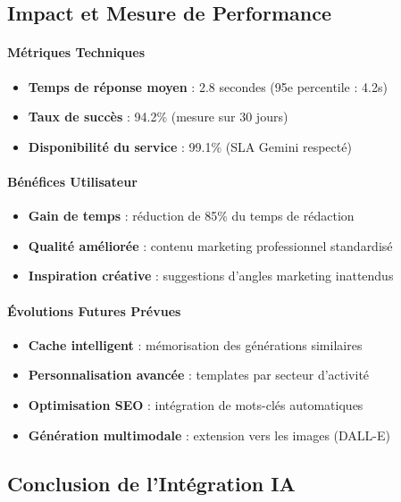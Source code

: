 \subsection{Impact et Mesure de Performance}

\paragraph{Métriques Techniques}
\begin{itemize}[label=\textbullet]
    \item \textbf{Temps de réponse moyen} : 2.8 secondes (95e percentile : 4.2s)
    \item \textbf{Taux de succès} : 94.2\% (mesure sur 30 jours)
    \item \textbf{Disponibilité du service} : 99.1\% (SLA Gemini respecté)
\end{itemize}

\paragraph{Bénéfices Utilisateur}
\begin{itemize}[label=\textbullet]
    \item \textbf{Gain de temps} : réduction de 85\% du temps de rédaction
    \item \textbf{Qualité améliorée} : contenu marketing professionnel standardisé
    \item \textbf{Inspiration créative} : suggestions d'angles marketing inattendus
\end{itemize}

\paragraph{Évolutions Futures Prévues}
\begin{itemize}[label=\textbullet]
    \item \textbf{Cache intelligent} : mémorisation des générations similaires
    \item \textbf{Personnalisation avancée} : templates par secteur d'activité
    \item \textbf{Optimisation SEO} : intégration de mots-clés automatiques
    \item \textbf{Génération multimodale} : extension vers les images (DALL-E)
\end{itemize}

\subsection{Conclusion de l'Intégration IA}

